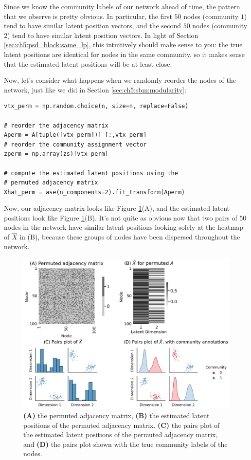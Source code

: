 Since we know the community labels of our network ahead of time, the pattern that we observe is pretty obvious. In particular, the first $50$ nodes (community $1$) tend to have similar latent position vectors, and the second $50$ nodes (community $2$) tend to have similar latent position vectors. In light of Section \ref{sec:ch5:psd_block:same_lp}, this intuitively should make sense to you: the true latent positions are {identical} for nodes in the same community, so it makes sense that the estimated latent positions will be at least close.

Now, let's consider what happens when we randomly reorder the nodes of the network, just like we did in Section \ref{sec:ch5:sbm:modularity}:

\begin{lstlisting}[style=python]
vtx_perm = np.random.choice(n, size=n, replace=False)

# reorder the adjacency matrix
Aperm = A[tuple([vtx_perm])] [:,vtx_perm]
# reorder the community assignment vector
zperm = np.array(zs)[vtx_perm]

# compute the estimated latent positions using the
# permuted adjacency matrix
Xhat_perm = ase(n_components=2).fit_transform(Aperm)
\end{lstlisting}
Now, our adjacency matrix looks like Figure \ref{fig:ch6:ase:ase_permuted}(A), and the estimated latent positions look like Figure \ref{fig:ch6:ase:ase_permuted}(B). It's not quite as obvious now that two pairs of $50$ nodes in the network have similar latent positions looking solely at the heatmap of $\hat X$ in (B), because these groups of nodes have been dispersed throughout the network. 

\begin{figure}
    \centering
    \includegraphics[width=\linewidth]{representations/ch6/Images/ase_permuted.png}
    \caption[ASE recovers latent structure, permutation-agnostic]{\textbf{(A)} the permuted adjacency matrix, \textbf{(B)} the estimated latent positions of the permuted adjacency matrix. \textbf{(C)} the pairs plot of the estimated latent positions of the permuted adjacency matrix, and \textbf{(D)} the pairs plot shown with the true community labels of the nodes.}
    \label{fig:ch6:ase:ase_permuted}
\end{figure}

